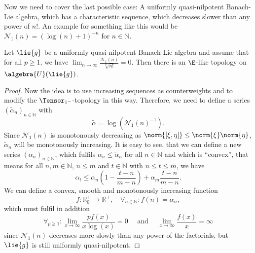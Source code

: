 \documentclass[
11pt,                          %
english                        %
]{article}
\begin{document}
Now we need to cover the last possible case: A uniformly quasi-nilpotent Banach-Lie 
algebra, which has a characteristic sequence, which decreases slower than any power 
of $n!$. An example for something like this would be $\mathcal{N}_1(n) = 
(\log(n) + 1)^{-n}$ for $n \in \mathbb{N}$.
\begin{proposition}
	\label{prop:mainthm_rev_2}
	Let $\lie{g}$ be a uniformly quasi-nilpotent Banach-Lie algebra and assume that 
	for all $p \geq 1$, we have $\lim_{n \rightarrow \infty} 
	\frac{\mathcal{N}_1(n)}{\sqrt[p]{n!}} = 0$. Then there is an $\E$-like topology 
	on $\algebra{U}(\lie{g})$.
\end{proposition}
\begin{proof}
	Now the idea is to use increasing sequences as counterweights and to modify the 
	$\Tensor_{1^-}$-topology in this way. Therefore, we need 
	to define a series $(\widetilde{\alpha}_n)_{n \in \mathbb{N}}$ with
	\begin{equation*}
		\widetilde{\alpha}
		=
		\log \left(
			\mathcal{N}_1(n)^{-1}
		\right).
	\end{equation*}
	Since $\mathcal{N}_1(n)$ is monotonously decreasing as $\norm{[\xi, \eta]} \leq 
	\norm{\xi} \norm{\eta}$, $\widetilde{\alpha}_n$ will be monotonously increasing.
	It is easy to see, that we can define a new series $(\alpha_n)_{n \in 
	\mathbb{N}}$, which fulfils $\alpha_n \leq \widetilde{\alpha}_n$ for all $n \in 
	\mathbb{N}$ and which is ``convex'', that means for all $n, m \in \mathbb{N}$, 
	$n \leq m$ and $t \in \mathbb{N}$ with $n \leq t \leq m$, we have
	\begin{equation*}
		\alpha_t 
		\leq 
		\alpha_n \left( 1 - \frac{t - n}{m - n} \right) + 
		\alpha_m \frac{t - n}{m - n}.
	\end{equation*}
	We can define a convex, smooth and monotonously increasing function
	\begin{equation*}
		f \colon
		\mathbb{R}_0^+
		\longrightarrow
		\mathbb{R}^+
		, \quad
		\forall_{n \in \mathbb{N}}
		\colon
		f(n) 
		=
		\alpha_n,
	\end{equation*}
	which must fulfil in addition
	\begin{equation*}
		\forall_{p \geq 1}
		\colon
		\lim_{x \rightarrow \infty}
		\frac{p f(x)}{x \log(x)}
		=
		0
		\quad \text{ and } \quad
		\lim_{x \rightarrow \infty}
		\frac{f(x)}{x}
		=
		\infty
	\end{equation*}
	since $\mathcal{N}_1(n)$ decreases more slowly than any power of the factorials, 
	but $\lie{g}$ is still uniformly quasi-nilpotent.
	

\end{proof}
\end{document}
